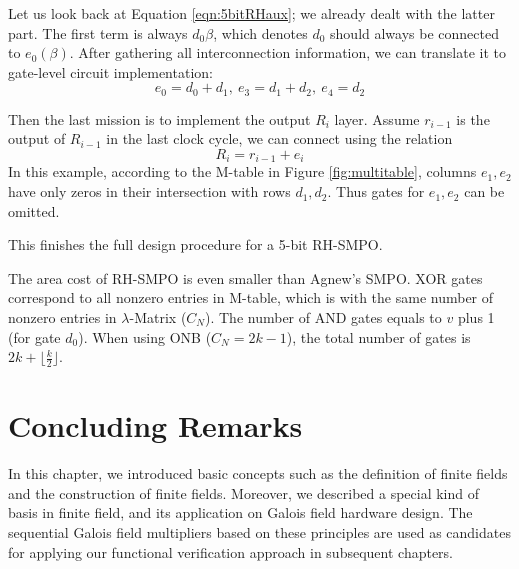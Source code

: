 \begin{Example}
Let us look back at Equation \ref{eqn:5bitRHaux}; we already dealt with the latter part.
The first term is always $d_0\beta$, which denotes $d_0$ should always be connected to $e_0(\beta)$.
After gathering all interconnection information, we can translate it to gate-level circuit implementation:
$$e_0 = d_0+d_1,~e_3=d_1+d_2,~e_4=d_2$$

Then the last mission is to implement the output $R_i$ layer. Assume $r_{i-1}$ is the output of 
$R_{i-1}$ in the last clock cycle, we can connect using the relation 
$$R_i = r_{i-1} + e_i$$
In this example, according to the M-table in Figure \ref{fig:multitable}, columns $e_1,e_2$
have only zeros in their intersection with rows $d_1,d_2$. Thus gates for $e_1,e_2$ can be omitted.

This finishes the full design procedure for a 5-bit RH-SMPO.
\end{Example}

The area cost of RH-SMPO is even smaller than Agnew's SMPO. XOR gates correspond to all nonzero entries 
in M-table, which is with the same number of nonzero entries in $\lambda$-Matrix ($C_N$). The number of AND gates 
equals to $v$ plus 1 (for gate $d_0$). When using ONB ($C_N = 2k-1$), the total number of gates 
is $2k+\lfloor \frac{k}{2}\rfloor$.

\section{Concluding Remarks}
In this chapter, we introduced basic concepts such as the definition of finite fields and the construction 
of finite fields. Moreover, we described a special kind of basis in finite field, and its 
application on Galois field hardware design. The sequential Galois field multipliers based on these 
principles are used as candidates for applying our functional verification approach in subsequent chapters.
